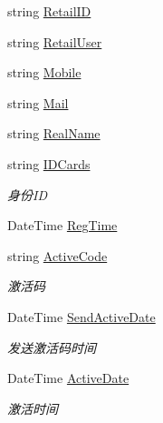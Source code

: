 \begin{DoxyCompactItemize}
\item 
string \mbox{\hyperlink{class_t_net_1_1_sns_1_1_sns_user_ac0eb71f1226ab5f2057c685af3caa481}{Retail\+ID}}
\item 
string \mbox{\hyperlink{class_t_net_1_1_sns_1_1_sns_user_ac8edbd65e0a1ddc0c414164a5c53a941}{Retail\+User}}
\item 
string \mbox{\hyperlink{class_t_net_1_1_sns_1_1_sns_user_ab2c1dbcc5d6aed04abcccbaa0a23774a}{Mobile}}
\item 
string \mbox{\hyperlink{class_t_net_1_1_sns_1_1_sns_user_af52f3d04068219d51c286b7056dc51cb}{Mail}}
\item 
string \mbox{\hyperlink{class_t_net_1_1_sns_1_1_sns_user_ad5ba8738850fbfe91566ade928515bb6}{Real\+Name}}
\item 
string \mbox{\hyperlink{class_t_net_1_1_sns_1_1_sns_user_a2c3b55dee812cf3a4ebf6a9fa0327ad7}{I\+D\+Cards}}
\begin{DoxyCompactList}\small\item\em 身份\+ID \end{DoxyCompactList}\item 
Date\+Time \mbox{\hyperlink{class_t_net_1_1_sns_1_1_sns_user_aa5b97d728e8dbf017383f4d09b47ef14}{Reg\+Time}}
\item 
string \mbox{\hyperlink{class_t_net_1_1_sns_1_1_sns_user_a41495c81079ef7d35232a71002f42e51}{Active\+Code}}
\begin{DoxyCompactList}\small\item\em 激活码 \end{DoxyCompactList}\item 
Date\+Time \mbox{\hyperlink{class_t_net_1_1_sns_1_1_sns_user_aa7ca90bc0628d348ad5100020be25626}{Send\+Active\+Date}}
\begin{DoxyCompactList}\small\item\em 发送激活码时间 \end{DoxyCompactList}\item 
Date\+Time \mbox{\hyperlink{class_t_net_1_1_sns_1_1_sns_user_aef6a596258d3647bda20882baa57b2bb}{Active\+Date}}
\begin{DoxyCompactList}\small\item\em 激活时间 \end{DoxyCompactList}\end{DoxyCompactItemize}


